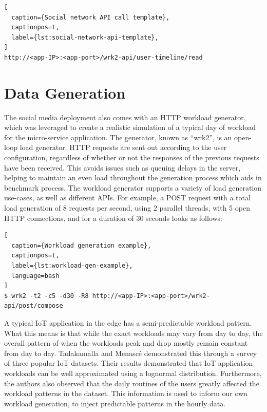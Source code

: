 \begin{lstlisting}[
  caption={Social network API call template},
  captionpos=t,
  label={lst:social-network-api-template},
]
http://<app-IP>:<app-port>/wrk2-api/user-timeline/read
\end{lstlisting}

\section{Data Generation}
\label{sec:ch5-data-generation}

The social media deployment also comes with an HTTP workload generator, which
was leveraged to create a realistic simulation of a typical day of workload for the micro-service application. The generator, known as ``wrk2'', is an open-loop load generator. HTTP requests are sent out according to the user configuration, regardless of whether or not the responses of the previous requests have been received. This avoids issues such as queuing delays in the server, helping to maintain an even load throughout the generation process which aids in benchmark process. The workload generator supports a variety of load generation use-cases, as well as different APIs. For example, a POST request with a total load generation of 8 requests per second, using 2 parallel threads, with 5 open HTTP connections, and for a duration of 30 seconds looks as follows:\par

\begin{lstlisting}[
  caption={Workload generation example},
  captionpos=t,
  label={lst:workload-gen-example},
  language=bash
]
$ wrk2 -t2 -c5 -d30 -R8 http://<app-IP>:<app-port>/wrk2-api/post/compose
\end{lstlisting}

A typical IoT application in the edge has a semi-predictable workload pattern. What this means is that while the exact workloads may vary from day to day, the overall pattern of when the workloads peak and drop mostly remain constant from day to day. Tadakamalla and Menasc{\'e} \cite{tadakamalla2019characterization} demonstrated this through a survey of three popular IoT datasets. Their results demonstrated that IoT application workloads can be well approximated using a lognormal distribution. Furthermore, the authors also observed that the daily routines of the users greatly affected the workload patterns in the dataset. This information is used to inform our own workload generation, to inject predictable patterns in the hourly data.\par

